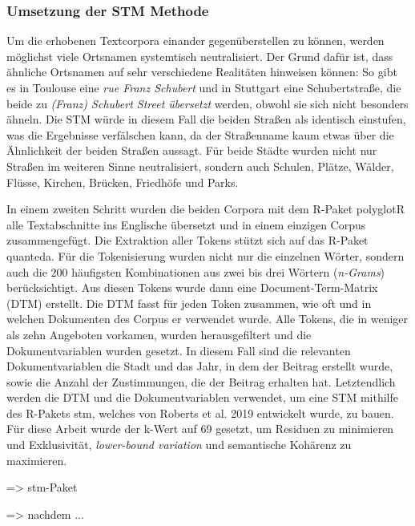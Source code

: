 \subsubsection{Umsetzung der STM Methode}

Um die erhobenen Textcorpora einander gegenüberstellen zu können, werden möglichst viele Ortsnamen systemtisch neutralisiert. 
Der Grund dafür ist, dass ähnliche Ortsnamen auf sehr verschiedene Realitäten hinweisen können: So gibt es in Toulouse eine \glqq{}\textit{rue Franz Schubert}\grqq{} und in Stuttgart eine \glqq Schubertstraße\grqq{}, die beide zu \glqq \textit{(Franz) Schubert Street übersetzt}\grqq{} werden, obwohl sie sich nicht besonders ähneln. 
Die STM würde in diesem Fall die beiden Straßen als identisch einstufen, was die Ergebnisse verfälschen kann, da der Straßenname kaum etwas über die Ähnlichkeit der beiden Straßen aussagt.
Für beide Städte wurden nicht nur Straßen im weiteren Sinne neutralisiert, sondern auch Schulen, Plätze, Wälder, Flüsse, Kirchen, Brücken, Friedhöfe und Parks.



In einem zweiten Schritt wurden die beiden Corpora mit dem R-Paket \glqq polyglotR\grqq{} alle Textabschnitte ins Englische übersetzt und in einem einzigen Corpus zusammengefügt.
Die Extraktion aller Tokens stützt sich auf das R-Paket \glqq quanteda\grqq{}. 
Für die Tokenisierung wurden nicht nur die einzelnen Wörter, sondern auch die 200 häufigsten Kombinationen aus zwei bis drei Wörtern (\textit{n-Grams}) berücksichtigt.
Aus diesen Tokens wurde dann eine Document-Term-Matrix (DTM) erstellt. 
Die DTM fasst für jeden Token zusammen, wie oft und in welchen Dokumenten des Corpus er verwendet wurde. 
Alle Tokens, die in weniger als zehn Angeboten vorkamen, wurden herausgefiltert und die Dokumentvariablen wurden gesetzt.
In diesem Fall sind die relevanten Dokumentvariablen die Stadt und das Jahr, in dem der Beitrag erstellt wurde, sowie die Anzahl der Zustimmungen, die der Beitrag erhalten hat.
Letztendlich werden die DTM und die Dokumentvariablen verwendet, um eine STM mithilfe des R-Pakets \glqq stm\grqq{}, welches von Roberts et al. 2019 entwickelt wurde, zu bauen.
Für diese Arbeit wurde der k-Wert auf 69 gesetzt, um Residuen zu minimieren und Exklusivität, \textit{lower-bound variation} und semantische Kohärenz zu maximieren.


=> stm-Paket

=> nachdem ...